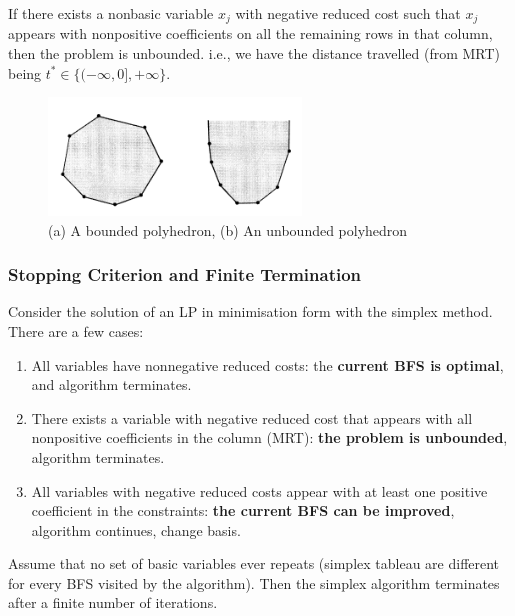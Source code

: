 \documentclass{article}
\begin{document}
\begin{definition}
    If there exists a nonbasic variable $x_j$ with negative reduced cost such that $x_j$ appears with nonpositive coefficients on all the remaining rows in that column, then the problem is unbounded. i.e., we have the distance travelled (from MRT) being $t^{*} \in \{(-\infty, 0], +\infty\}$. 
\end{definition}

\begin{figure}[H]
    \centering
    \includegraphics[width=0.6\textwidth]{Images/unbounded.png}
    \caption{(a) A bounded polyhedron, (b) An unbounded polyhedron}
    \label{fig:2-unboundedlp}
\end{figure} 

\subsubsection{Stopping Criterion and Finite Termination}

Consider the solution of an LP in minimisation form with the simplex method. There are a few cases: \begin{enumerate}
    \item All variables have nonnegative reduced costs: the \textbf{current BFS is optimal}, and algorithm terminates.
    \item There exists a variable with negative reduced cost that appears with all nonpositive coefficients in the column (MRT): \textbf{the problem is unbounded}, algorithm terminates.
    \item All variables with negative reduced costs appear with at least one positive coefficient in the constraints:\textbf{ the current BFS can be improved}, algorithm continues, change basis.
\end{enumerate}


\begin{theorem}
    Assume that no set of basic variables ever repeats (simplex tableau are different for every BFS visited by the algorithm). Then the simplex algorithm terminates after a finite number of iterations.
\end{theorem}
\end{document}
